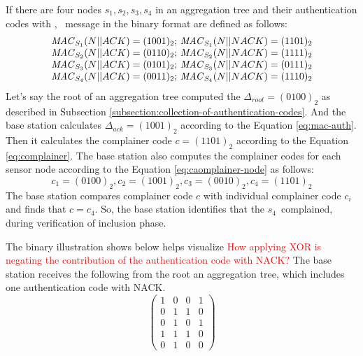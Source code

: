 		\begin{exmp} 
			If there are four nodes ${s_{1},s_{2},s_{3},s_{4}}$ in an aggregation tree and their authentication codes with \ack, \nack\ message in the binary format are defined as follows:
			\begin{equation}
				\begin{array}{l}
					\mac_{S_{1}}(N || \ack) = (1001)_{2};\ \mac_{S_{1}}(N || \nack) = (1101)_{2}\\
					\mac_{S_{2}}(N || \ack) = (0110)_{2};\ \mac_{S_{2}}(N || \nack) = (1111)_{2}\\	
					\mac_{S_{3}}(N || \ack) = (0101)_{2};\ \mac_{S_{3}}(N || \nack) = (0111)_{2}\\
					\mac_{S_{4}}(N || \ack) = (0011)_{2};\ \mac_{S_{4}}(N || \nack) = (1110)_{2}
				\end{array}
			\end{equation}
			Let's say the root of an aggregation tree computed the $\Delta_{root} = (0100)_{2}$ as described in Subsection \ref{subsection:collection-of-authentication-codes}.
			And the base station calculates $\Delta_{ack} = (1001)_{2}$ according to the Equation \ref{eq:mac-auth}.
			Then it calculates the complainer code $c = (1101)_{2}$ according to the Equation \ref{eq:complainer}.
			The base station also computes the complainer codes for each sensor node according to the Equation \ref{eq:caomplainer-node} as follows:
			\begin{equation}			
				c_{1} = (0100)_{2}, c_{2} = (1001)_{2}, c_{3} = (0010)_{2}, c_{4} = (1101)_{2}
			\end{equation}
			The base station compares complainer code $c$ with individual complainer code $c_{i}$ and finds that $c=c_{4}$.
			So, the base station identifies that the $s_{4}$\ complained, during verification of inclusion phase.
		\end{exmp}
		The binary illustration shows below helps visualize	\textcolor{red}{How applying XOR is negating the contribution of the authentication code with NACK?}
		The base station receives the following from the root an aggregation tree, which includes one authentication code with NACK.
		\[ 
			\left( 
				\begin{array}{cccc}
					1 & 0 & 0 & 1 \\ 
					0 & 1 & 1 & 0 \\
					0 & 1 & 0 & 1 \\
					1 & 1 & 1 & 0 \\
					\hline
					0 & 1 & 0 & 0 
				\end{array}
			\right)
		\]
